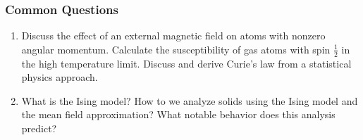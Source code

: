 \documentclass[11pt, a4paper]{article}
\begin{document}
\subsubsection{Common Questions}
\begin{enumerate}
    \item Discuss the effect of an external magnetic field on atoms with nonzero angular momentum. Calculate the susceptibility of gas atoms with spin $ \frac{1}{2} $ in the high temperature limit. Discuss and derive Curie's law from a statistical physics approach.

    \item What is the Ising model? How to we analyze solids using the Ising model and the mean field approximation? What notable behavior does this analysis predict?

\end{enumerate}
\end{document}

